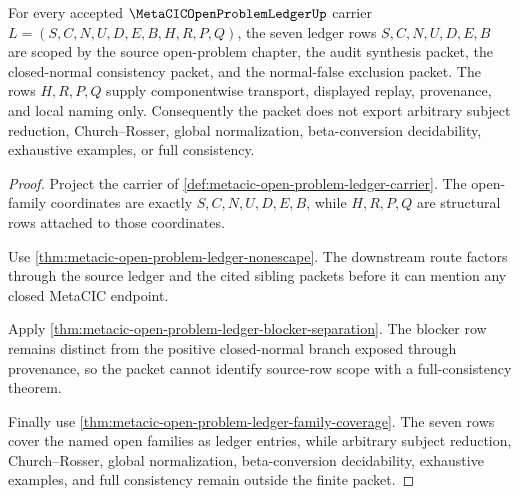 \begin{theorem}
\label{thm:metacic-open-problem-ledger-source-row-scope}
For every accepted $\MetaCICOpenProblemLedgerUp$ carrier $L=(S,C,N,U,D,E,B,H,R,P,Q)$, the seven ledger rows $S,C,N,U,D,E,B$ are scoped by the source open-problem chapter, the audit synthesis packet, the closed-normal consistency packet, and the normal-false exclusion packet. The rows $H,R,P,Q$ supply componentwise transport, displayed replay, provenance, and local naming only. Consequently the packet does not export arbitrary subject reduction, Church--Rosser, global normalization, beta-conversion decidability, exhaustive examples, or full consistency.
\end{theorem}
\begin{proof}
Project the carrier of \autoref{def:metacic-open-problem-ledger-carrier}. The open-family coordinates are exactly $S,C,N,U,D,E,B$, while $H,R,P,Q$ are structural rows attached to those coordinates.

Use \autoref{thm:metacic-open-problem-ledger-nonescape}. The downstream route factors through the source ledger and the cited sibling packets before it can mention any closed MetaCIC endpoint.

Apply \autoref{thm:metacic-open-problem-ledger-blocker-separation}. The blocker row remains distinct from the positive closed-normal branch exposed through provenance, so the packet cannot identify source-row scope with a full-consistency theorem.

Finally use \autoref{thm:metacic-open-problem-ledger-family-coverage}. The seven rows cover the named open families as ledger entries, while arbitrary subject reduction, Church--Rosser, global normalization, beta-conversion decidability, exhaustive examples, and full consistency remain outside the finite packet.
\end{proof}

